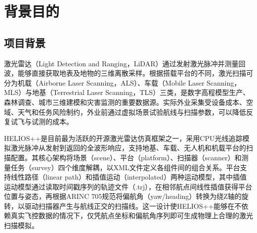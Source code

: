 \documentclass[a4paper,fleqn]{cas-sc}
\begin{document}
\let\WriteBookmarks\relax
\def\floatpagepagefraction{1}
\def\textpagefraction{.001}

\shorttitle{}
\title[mode=title]{}




\MakeNJFUTitlePage[UseDocTitle]
\tableofcontents
\newpage

\section{背景目的}

\subsection{项目背景}

激光雷达（Light Detection and Ranging，LiDAR）通过发射激光脉冲并测量回波，能够直接获取地表及地物的三维离散采样。根据搭载平台的不同，激光扫描可分为机载（Airborne Laser Scanning，ALS）、车载（Mobile Laser Scanning，MLS）与地基（Terrestrial Laser Scanning，TLS）三类，是数字高程模型生产、森林调查、城市三维建模和灾害监测的重要数据源。实际外业采集受设备成本、空域、天气和任务风险制约，外业前通过虚拟场景试验航线与扫描参数，可以降低反复试飞与试测的成本。

HELIOS++是目前最为活跃的开源激光雷达仿真框架之一，采用CPU光线追踪模拟激光脉冲从发射到返回的全波形响应，支持地基、车载、无人机和机载平台的扫描配置\citep{heliosPlusPlus,heliosPlusPlus2}。其核心架构将场景（scene）、平台（platform）、扫描器（scanner）和测量任务（survey）四个维度解耦，以XML文件定义各组件间的组合关系。平台支持线性路径（linear path）和插值运动（interpolated）两种运动模型，其中插值运动模型通过读取时间戳序列的轨迹文件（.trj），在相邻航点间线性插值获得平台位置与姿态，再根据ARINC 705规范将偏航角（yaw/heading）转换为绕Z轴的旋转，以驱动扫描器产生与航线正交的扫描线。这一设计使HELIOS++能够在不依赖真实飞控数据的情况下，仅凭航点坐标和偏航角序列即可生成物理上合理的激光扫描模拟。
\end{document}
